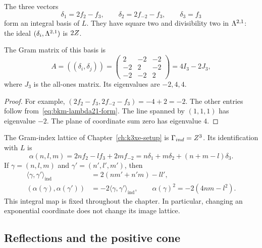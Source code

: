 The three vectors
\begin{equation}
\label{eq:bkm-type-ii-simple-roots}
 \delta_1=2f_2-f_3,\qquad
 \delta_2=2f_{-2}-f_3,\qquad \delta_3=f_3
\end{equation}
form an integral basis of $L$. They have square two and divisibility
two in $\Lambda^{2,1}$: the ideal $(\delta_i,\Lambda^{2,1})$ is $2Z$.

\begin{lemma}
\label{lem:bkm-cartan-matrix}
The Gram matrix of this basis is
\begin{equation}
\label{eq:bkm-cartan-matrix}
 A=((\delta_i,\delta_j))
 =\begin{pmatrix}2&-2&-2\\-2&2&-2\\-2&-2&2\end{pmatrix}
 =4I_3-2J_3,
\end{equation}
where $J_3$ is the all-ones matrix. Its eigenvalues are $-2,4,4$.
\end{lemma}
\begin{proof}
For example,
$(2f_2-f_3,2f_{-2}-f_3)=-4+2=-2$.
The other entries follow from~\eqref{eq:bkm-lambda21-form}.
The line spanned by $(1,1,1)$ has eigenvalue $-2$. The plane of
coordinate sum zero has eigenvalue $4$.
\end{proof}

The Gram-index lattice of Chapter~\ref{ch:k3xe-setup} is
$\Gamma_{ind}=Z^3$. Its identification with $L$ is
\begin{equation}
\label{eq:bkm-alpha-map}
 \alpha(n,l,m)=2nf_2-lf_3+2mf_{-2}
 =n\delta_1+m\delta_2+(n+m-l)\delta_3.
\end{equation}
If $\gamma=(n,l,m)$ and $\gamma'=(n',l',m')$, then
\begin{align}
\label{eq:bkm-gram-index-pairing}
 \langle\gamma,\gamma'\rangle_{\mathrm{ind}}
 &=2(nm'+n'm)-ll',\\
\label{eq:bkm-pullback-pairing}
 (\alpha(\gamma),\alpha(\gamma'))
 &=-2\langle\gamma,\gamma'\rangle_{\mathrm{ind}},\qquad
 \alpha(\gamma)^2=-2(4nm-l^2).
\end{align}
This integral map is fixed throughout the chapter. In particular,
changing an exponential coordinate does not change its image lattice.

\subsection{Reflections and the positive cone}
\label{sec:bkm-walls-chamber}

